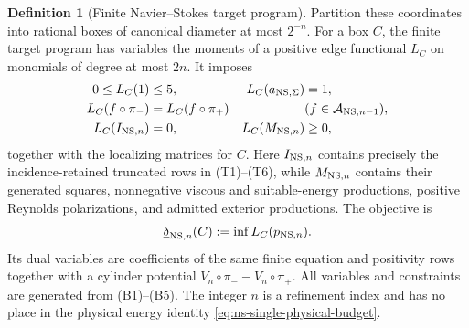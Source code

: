 \documentclass[11pt]{article}
\numberwithin{section}{part}
\theoremstyle{plain}
\theoremstyle{definition}
\newtheorem{definition}[definition]{Definition}
\theoremstyle{remark}
\begin{document}
\begin{definition}[Finite Navier--Stokes target program]
Partition these coordinates into rational boxes of canonical diameter at
most \(2^{-n}\).  For a box \(C\), the finite target program has variables
the moments of a positive edge functional \(L_C\) on monomials of degree at
most \(2n\).  It imposes
\begin{align}
 0\le L_C(1)&\le5,
 &L_C(a_{{\rm NS},\Sigma})&=1,
 \label{eq:ns-finite-program-normalization}\\
 L_C(f\circ\pi_-)&=L_C(f\circ\pi_+)
 &&(f\in\mathcal A_{{\rm NS},n-1}),
 \label{eq:ns-finite-program-circulation}\\
 L_C(I_{{\rm NS},n})&=0,
 &L_C(M_{{\rm NS},n})&\ge0,
 \label{eq:ns-finite-program-order}
\end{align}
together with the localizing matrices for \(C\).  Here
\(I_{{\rm NS},n}\) contains precisely the incidence-retained truncated rows in
\textup{(T1)}--\textup{(T6)}, while \(M_{{\rm NS},n}\) contains their
generated squares, nonnegative viscous and suitable-energy productions,
positive Reynolds polarizations, and admitted exterior productions.  The
objective is
\begin{equation}
 \label{eq:ns-finite-program-objective}
 \underline\delta_{{\rm NS},n}(C)
 :=\inf L_C(p_{{\rm NS},n}).
\end{equation}
Its dual variables are coefficients of the same finite equation and
positivity rows together with a cylinder potential
\(V_n\circ\pi_- -V_n\circ\pi_+\).  All variables and constraints are
generated from \textup{(B1)}--\textup{(B5)}.  The integer \(n\) is a
refinement index and has no place in the physical energy identity
\eqref{eq:ns-single-physical-budget}.
\end{definition}
\end{document}

